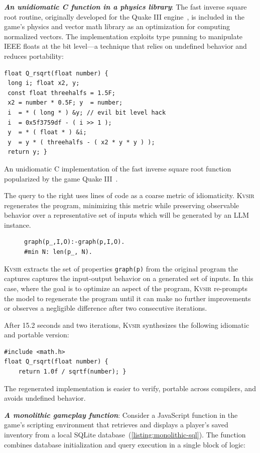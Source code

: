 \documentclass[sigplan,review,anonymous,10pt]{acmart}
\newcommand{\sys}{{\scshape Kv{\textalpha}sir}\xspace}
\newcommand{\heading}[1]{\vspace{2pt}\noindent\textbf{\emph{#1}}:\enspace}
\begin{document}
\heading{An unidiomatic C function in a physics library}
The fast inverse square root routine, originally developed for the Quake III
engine~\cite{fast_inv_sqrt}, is included in the game's physics and vector math
library as an optimization for computing normalized vectors.
The implementation
exploits type punning to manipulate IEEE floats at the bit level—a technique
that relies on undefined behavior and reduces portability:
\begin{listing}
\begin{verbatim}
float Q_rsqrt(float number) {
 long i; float x2, y;
 const float threehalfs = 1.5F;
 x2 = number * 0.5F; y  = number;
 i  = * ( long * ) &y; // evil bit level hack
 i  = 0x5f3759df - ( i >> 1 );
 y  = * ( float * ) &i;
 y  = y * ( threehalfs - ( x2 * y * y ) );
 return y; }
\end{verbatim}
\caption{An unidiomatic C implementation of the fast inverse square root function popularized by the game Quake III~\cite{fast_inv_sqrt}.}
\end{listing}
The query to the right uses lines of code as a coarse metric of
idiomaticity. \sys regenerates the program, minimizing this metric while
preserving observable behavior over a representative set of inputs which will be generated by an LLM instance.
\begin{figure}
\begin{verbatim}
graph(p_,I,O):-graph(p,I,O).
#min N: len(p_, N).
\end{verbatim}
\end{figure}
\sys extracts the set of properties \texttt{graph(p)}
from the original program
the captures captures the input-output behavior on a generated set of
inputs.
In this case, where the goal is to optimize an aspect of the program, \sys
re-prompts the model to regenerate the program until it can make no further
improvements or observes a negligible difference after two consecutive
iterations.

After 15.2 seconds and two iterations, \sys synthesizes the following idiomatic and portable version:
\begin{verbatim}
#include <math.h>
float Q_rsqrt(float number) {
    return 1.0f / sqrtf(number); }
\end{verbatim}
The regenerated implementation is easier to verify, portable across compilers, and avoids undefined behavior.

\heading{A monolithic gameplay function}
Consider a JavaScript function in the game's scripting environment that
retrieves and displays a player's saved inventory from a local SQLite database~(\cref{listing:monolithic-sql}).
The function combines database initialization and query execution in a single
block of logic:
\end{document}
